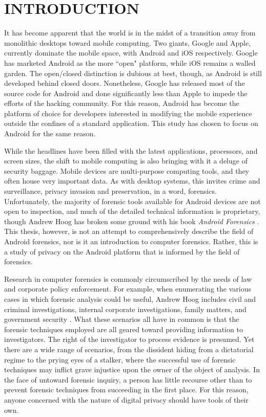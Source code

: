 \chapter{INTRODUCTION}
\label{ch:introduction}

It has become apparent that the world is in the midst of a transition away from monolithic desktops toward mobile computing.  Two
giants, Google and Apple, currently dominate the mobile space, with Android and iOS respectively.  Google has marketed Android as
the more ``open" platform, while iOS remains a walled garden.  The open/closed distinction is dubious at best, though, as Android is
still developed behind closed doors.  Nonetheless, Google has released most of the source code for Android and done significantly
less than Apple to impede the efforts of the hacking community. For this reason, Android has become the platform of choice for
developers interested in modifying the mobile experience outside the confines of a standard application.  This study has chosen
to focus on Android for the same reason.

While the headlines have been filled with the latest applications, processors, and screen sizes, the shift to mobile computing is
also bringing with it a deluge of security baggage. Mobile devices are multi-purpose computing tools, and they often house very
important data. As with desktop systems, this invites crime and surveillance, privacy invasion and preservation, in a word,
forensics.  Unfortunately, the majority of forensic tools available for Android devices are not open to inspection, and much of the
detailed technical information is proprietary, though Andrew Hoog has broken some ground with his book \emph{Android Forensics}
\cite{hoog}.  This thesis, however, is not an attempt to comprehensively describe the field of Android forensics, nor is it an
introduction to computer forensics. Rather, this is a study of privacy on the Android platform that is informed by the field of
forensics.

Research in computer forensics is commonly circumscribed by the needs of law and corporate policy enforcement.  For example, when
enumerating the various cases in which forensic analysis could be useful, Andrew Hoog includes civil and criminal investigations,
internal corporate investigations, family matters, and government security \cite{hoog}.  What these scenarios all have in common is
that the forensic techniques employed are all geared toward providing information to investigators.  The right of the investigator
to process evidence is presumed.  Yet there are a wide range of scenarios, from the dissident hiding from a dictatorial regime to
the prying eyes of a stalker, where the successful use of forensic techniques may inflict grave injustice upon the owner of the
object of analysis.  In the face of untoward forensic inquiry, a person has little recourse other than to prevent forensic
techniques from succeeding in the first place. For this reason, anyone concerned with the nature of digital privacy should have
tools of their own.  

